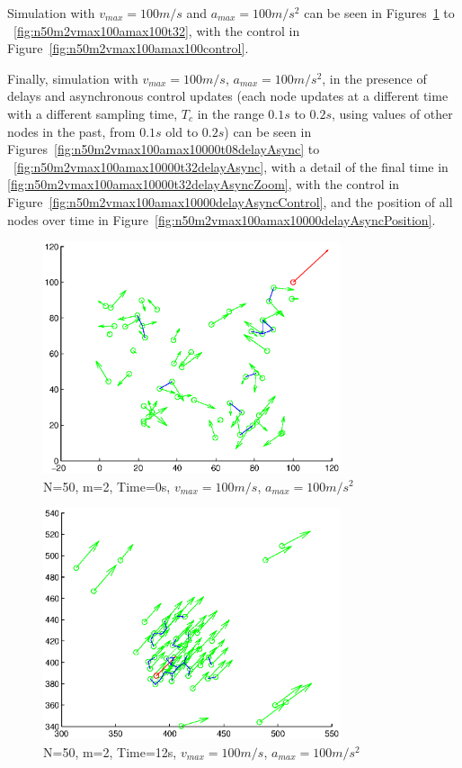 \documentclass[10pt, conference]{IEEEtran}
\begin{document}
Simulation with $v_{max}=100m/s$ and $a_{max}=100m/s^2$ can be seen in Figures~\ref{fig:n50m2vmax100amax100t00} to ~\ref{fig:n50m2vmax100amax100t32}, with the control in Figure~\ref{fig:n50m2vmax100amax100control}.

Finally, simulation with $v_{max}=100m/s$, $a_{max}=100m/s^2$, in the presence of delays and asynchronous control updates (each node updates at a different time with a different sampling time, $T_c$ in the range $0.1s$ to $0.2s$, using values of other nodes in the past, from $0.1s$ old to $0.2s$) can be seen in Figures~\ref{fig:n50m2vmax100amax10000t08delayAsync} to ~\ref{fig:n50m2vmax100amax10000t32delayAsync}, with a detail of the final time in \ref{fig:n50m2vmax100amax10000t32delayAsyncZoom}, with the control in Figure~\ref{fig:n50m2vmax100amax10000delayAsyncControl}, and the position of all nodes over time in Figure~\ref{fig:n50m2vmax100amax10000delayAsyncPosition}.

\begin{figure}[!h]
  \begin{center}
    \includegraphics[width=3.45in]{n50m2vmax100amax100t00}
  \end{center}

  \caption{\small N=50, m=2, Time=0s, $v_{max}=100m/s$, $a_{max}=100m/s^2$}
  \label{fig:n50m2vmax100amax100t00}
\end{figure}

\begin{figure}[!h]
  \begin{center}
    \includegraphics[width=3.45in]{n50m2vmax100amax100t12}
  \end{center}

  \caption{\small N=50, m=2, Time=12s, $v_{max}=100m/s$, $a_{max}=100m/s^2$}
  \label{fig:n50m2vmax100amax100t12}
\end{figure}
\end{document}
